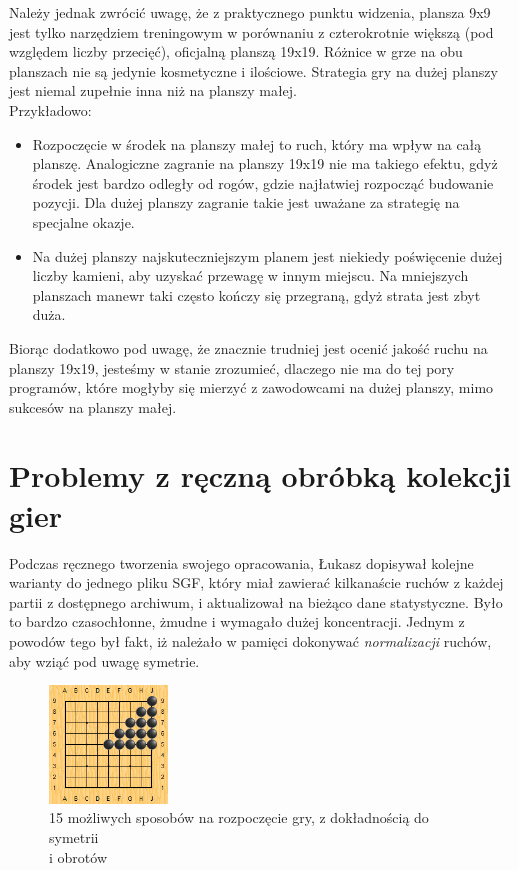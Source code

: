 \documentclass[11pt,leqno]{article}
\begin{document}
Należy jednak zwrócić uwagę, że z praktycznego punktu widzenia, plansza 9x9 jest tylko narzędziem treningowym w 
porównaniu z czterokrotnie większą (pod względem liczby przecięć), oficjalną planszą 19x19. Różnice w grze na obu planszach
 nie są jedynie kosmetyczne i ilościowe. Strategia gry na dużej planszy jest niemal zupełnie inna niż na planszy małej. \\
Przykładowo:
\begin{itemize}
\item Rozpoczęcie w środek na planszy małej to ruch, który ma wpływ na całą planszę. Analogiczne zagranie na planszy 19x19 nie ma takiego 
efektu, gdyż środek jest bardzo odległy od rogów, gdzie najłatwiej rozpocząć budowanie pozycji. Dla dużej planszy zagranie takie jest
 uważane za strategię na specjalne okazje.
\item Na dużej planszy najskuteczniejszym planem jest niekiedy poświęcenie dużej liczby kamieni, aby uzyskać przewagę w innym miejscu.
 Na mniejszych planszach manewr taki często kończy się przegraną, gdyż strata jest zbyt duża.
\end{itemize}

Biorąc dodatkowo pod uwagę, że znacznie trudniej jest ocenić jakość ruchu na planszy 19x19, jesteśmy w stanie zrozumieć, dlaczego 
nie ma do tej pory programów, które mogłyby się mierzyć z zawodowcami na dużej planszy, mimo sukcesów na planszy małej.

\section{Problemy z ręczną obróbką kolekcji gier}

Podczas ręcznego tworzenia swojego opracowania, Łukasz dopisywał kolejne warianty do jednego pliku SGF, który miał 
zawierać kilkanaście ruchów z każdej partii z dostępnego archiwum, i aktualizował na bieżąco dane statystyczne. Było to bardzo 
czasochłonne, żmudne i wymagało dużej koncentracji. Jednym z powodów tego był fakt, iż należało w pamięci dokonywać \emph{normalizacji}
 ruchów, aby wziąć pod uwagę symetrie. 

\begin{figure}
  \vspace{-20pt}
  \begin{center}
    \includegraphics[width=0.28\textwidth]{symetria.png}
  \end{center}
  \vspace{-20pt}
  \caption{15 możliwych sposobów na rozpoczęcie gry, z dokładnością do symetrii \\i obrotów}
  \vspace{-10pt}
\end{figure}
\end{document}
